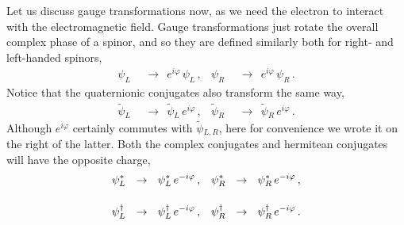 \documentclass[epsfig,12pt]{article}
\newcommand{\wt}{\widetilde}
\begin{document}
	Let us discuss gauge transformations now, as we need the electron to interact with the electromagnetic field.
	Gauge transformations just rotate the overall complex phase of a spinor, and so they are defined
	similarly both for right- and left-handed spinors,
\begin{align}
	\psi_L		& ~~\to~~		e^{i\varphi}\,\psi_L\,,
	&
	\psi_R		& ~~\to~~		e^{i\varphi}\,\psi_R\,.
\end{align}
	Notice that the quaternionic conjugates also transform the same way,
\begin{align}
	\wt\psi{}_L		& ~~\to~~		\wt\psi{}_L\,e^{i\varphi}\,,
	&
	\wt\psi{}_R		& ~~\to~~		\wt\psi{}_R\,e^{i\varphi}\,.
\end{align}
	Although $ e^{i\varphi} $ certainly commutes with $ \wt\psi{}_{L,R} $,
	here for convenience we wrote it on the right of the latter.
	Both the complex conjugates and hermitean conjugates will have the opposite charge,
\begin{align}
%
\notag
	\psi_L^*		& ~~\to~~		\psi_L^*\,e^{-i\varphi}\,,
	&
	\psi_R^*		& ~~\to~~		\psi_R^*\,e^{-i\varphi}\,,
	\\[4mm]
%
	\psi_L^\dag		& ~~\to~~		\psi_L^\dag\,e^{-i\varphi}\,,
	&
	\psi_R^\dag		& ~~\to~~		\psi_R^\dag\,e^{-i\varphi}\,.
\end{align}
\end{document}
